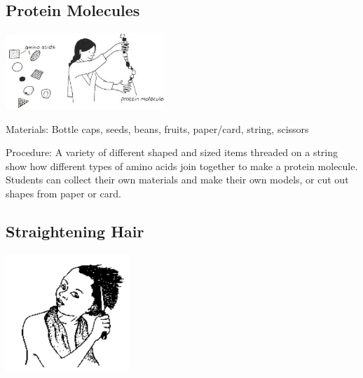 \begin{multicols}{2}
\subsection{Protein Molecules} %

\begin{center}
\includegraphics[width=0.45\textwidth]{./img/vso/proteins.jpg}
\end{center}

\begin{description*}
\item[Materials:]{Bottle caps, seeds, beans, fruits, paper/card, string, scissors}
\item[Procedure:]{A variety of different shaped and
sized items threaded on a string
show how different types of
amino acids join together to
make a protein molecule.
Students can collect their own
materials and make their own
models, or cut out
shapes from paper or card.}
\end{description*}

\subsection{Straightening Hair} %

\begin{center}
\includegraphics[width=0.35\textwidth]{./img/source/straight-hair.png}
\end{center}


\end{multicols}
